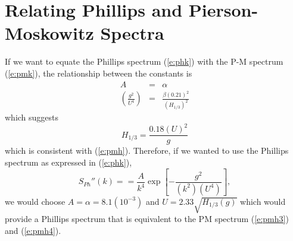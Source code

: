 \documentclass[11pt]{article}
\begin{document}
\section{Relating Phillips and Pierson-Moskowitz Spectra}
If we want to equate the Phillips spectrum (\ref{e:phk}) with the P-M spectrum  (\ref{e:pmk}), the relationship between the constants is
\begin{eqnarray}
A & = & \alpha \\
\left(\frac{g^2}{U^4}\right) & = & \frac{\beta (0.21)^2}{\left(H_{1/3}\right)^2}
\end{eqnarray}
which suggests
\begin{equation}
H_{1/3}=\frac{0.18 (U)^2}{g}
\label{e:phh}
\end{equation}
which is consistent with (\ref{e:pmh}).  Therefore, if we wanted to use the Phillips spectrum as expressed in (\ref{e:phk}),
\begin{equation} 
S_{Ph}''(k)= 
= \frac{A}{k^4} \exp{\left[ - \frac{g^2}{(k^2)(U^4)} \right]},
\end{equation}
we would choose $A=\alpha=8.1(10^{-3})$ and $U=2.33\sqrt{H_{1/3}(g)}$ which would provide a Phillips spectrum that is equivalent to the PM spectrum (\ref{e:pmh3}) and (\ref{e:pmh4}).
\newpage
\setcounter{page}{1}


\end{document}
